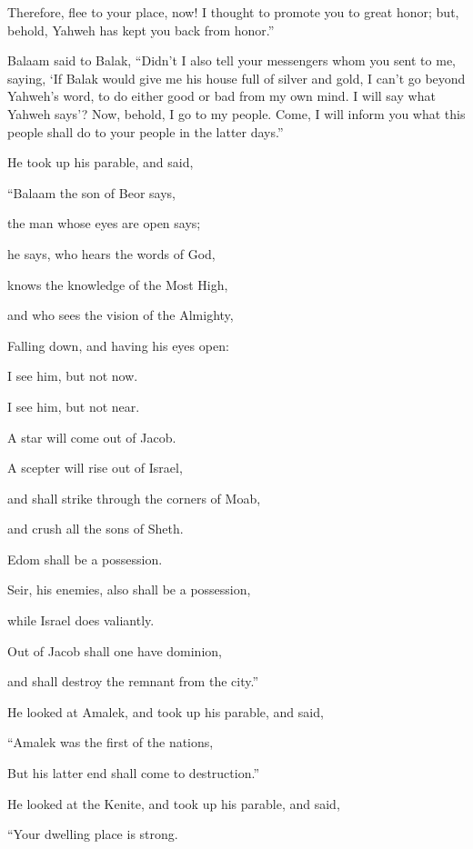{Therefore, flee to your place, now! I thought to promote you to great honor; but, behold, Yahweh has kept you back from honor.”
\par }{\PP {}Balaam said to Balak, “Didn’t I also tell your messengers whom you sent to me, saying,
‘If Balak would give me his house full of silver and gold, I can’t go beyond Yahweh’s word, to do either good or bad from my own mind. I will say what Yahweh says’?
Now, behold, I go to my people. Come, I will inform you what this people shall do to your people in the latter days.”
\par }{\PP {}He took up his parable, and said,
\par }{\Q “Balaam the son of Beor says,
\par }{\QB the man whose eyes are open says;
\par }{\QB {}he says, who hears the words of God,
\par }{\QB knows the knowledge of the Most High,
\par }{\QB and who sees the vision of the Almighty,
\par }{\QB Falling down, and having his eyes open:
\par }{\Q {}I see him, but not now.
\par }{\QB I see him, but not near.
\par }{\Q A star will come out of Jacob.
\par }{\QB A scepter will rise out of Israel,
\par }{\Q and shall strike through the corners of Moab,
\par }{\QB and crush all the sons of Sheth.
\par }{\Q {}Edom shall be a possession.
\par }{\QB Seir, his enemies, also shall be a possession,
\par }{\QB while Israel does valiantly.
\par }{\Q {}Out of Jacob shall one have dominion,
\par }{\QB and shall destroy the remnant from the city.”
\par }{\PP {}He looked at Amalek, and took up his parable, and said,
\par }{\Q “Amalek was the first of the nations,
\par }{\QB But his latter end shall come to destruction.”
\par }{\PP {}He looked at the Kenite, and took up his parable, and said,
\par }{\Q “Your dwelling place is strong.
}
